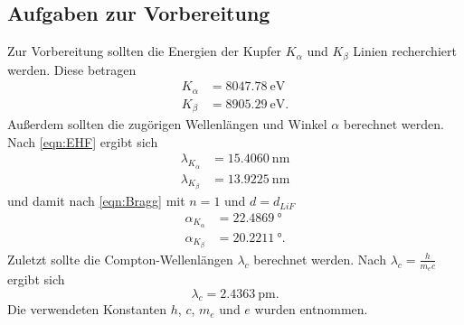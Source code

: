 \subsection{Aufgaben zur Vorbereitung}
Zur Vorbereitung sollten die Energien der Kupfer $K_\alpha$ und $K_\beta$ Linien recherchiert werden.\cite{Copper}
Diese betragen
\begin{align*}
    K_\alpha &= \SI{8047,78}{\electronvolt}\\
    K_\beta &= \SI{8905,29}{\electronvolt}. 
\end{align*}
Außerdem sollten die zugörigen Wellenlängen und Winkel $\alpha$ berechnet werden.
Nach \eqref{eqn:EHF} ergibt sich
\begin{align*}
    \lambda_{K_\alpha} &= \SI{15,4060}{\nano\meter}\\
    \lambda_{K_\beta} &= \SI{13,9225}{\nano\meter}
\end{align*}
und damit nach \eqref{eqn:Bragg} mit $n=1$ und $d = d_{LiF}$
\begin{align*}
    \alpha_{K_\alpha} &= \SI{22,4869}{\degree}\\
    \alpha_{K_\beta} &= \SI{20,2211}{\degree} .
\end{align*}
Zuletzt sollte die Compton-Wellenlängen $\lambda_c$ berechnet werden. Nach $\lambda_c = \frac{h}{m_ec}$ ergibt sich
\begin{equation*}
    \lambda_c = \SI{2,4363}{\pico\meter}.
\end{equation*}
Die verwendeten Konstanten $h$, $c$, $m_e$ und $e$ wurden \cite{Gerth} entnommen.
